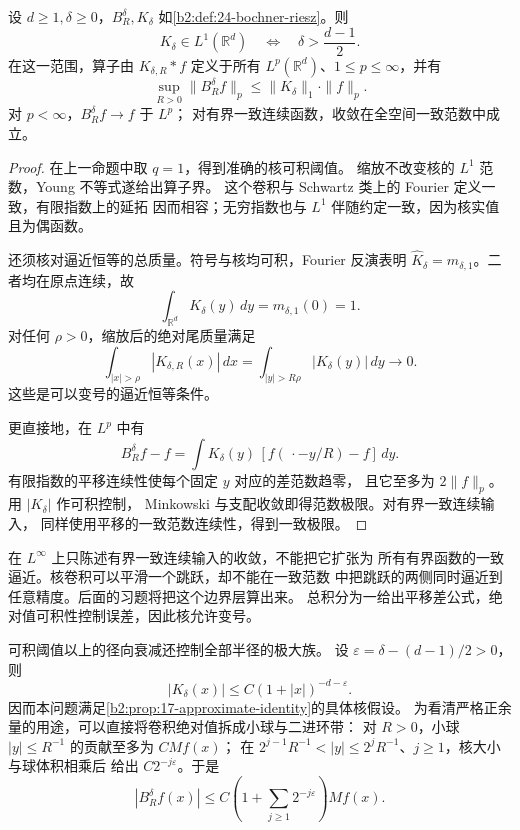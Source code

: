 \begin{theorem}[可积核范围]\label{b2:thm:24-integrable}
设 \(d\geq1,\delta\geq0\)，\(B_R^\delta,K_\delta\)
如\cref{b2:def:24-bochner-riesz}。则
\[
 K_\delta\in L^1(\mathbb R^d)
       \quad\Longleftrightarrow\quad \delta>\frac{d-1}{2}.
\]
在这一范围，算子由 \(K_{\delta,R}*f\) 定义于所有
\(L^p(\mathbb R^d)\)、\(1\leq p\leq\infty\)，并有
\[
 \sup_{R>0}\|B_R^\delta f\|_p
       \leq\|K_\delta\|_1\cdot\|f\|_p.
\]
对 \(p<\infty\)，\(B_R^\delta f\to f\) 于 \(L^p\)；
对有界一致连续函数，收敛在全空间一致范数中成立。
\end{theorem}
\begin{proof}
在上一命题中取 \(q=1\)，得到准确的核可积阈值。
缩放不改变核的 \(L^1\) 范数，Young 不等式遂给出算子界。
这个卷积与 Schwartz 类上的 Fourier 定义一致，有限指数上的延拓
因而相容；无穷指数也与 \(L^1\) 伴随约定一致，因为核实值且为偶函数。

还须核对逼近恒等的总质量。符号与核均可积，Fourier 反演表明
\(\widehat K_\delta=m_{\delta,1}\)。二者均在原点连续，故
\[
 \int_{\mathbb R^d}K_\delta(y)\,dy=m_{\delta,1}(0)=1.
\]
对任何 \(\rho>0\)，缩放后的绝对尾质量满足
\[
 \int_{|x|>\rho}|K_{\delta,R}(x)|\,dx
       =\int_{|y|>R\rho}|K_\delta(y)|\,dy\longrightarrow0.
\]
这些是可以变号的逼近恒等条件。

更直接地，在 \(L^p\) 中有
\[
 B_R^\delta f-f
       =\int K_\delta(y)\,[f(\,\cdot-y/R)-f]\,dy.
\]
有限指数的平移连续性使每个固定 \(y\) 对应的差范数趋零，
且它至多为 \(2\|f\|_p\)。用 \(|K_\delta|\) 作可积控制，
Minkowski 与支配收敛即得范数极限。对有界一致连续输入，
同样使用平移的一致范数连续性，得到一致极限。
\end{proof}

在 \(L^\infty\) 上只陈述有界一致连续输入的收敛，不能把它扩张为
所有有界函数的一致逼近。核卷积可以平滑一个跳跃，却不能在一致范数
中把跳跃的两侧同时逼近到任意精度。后面的习题将把这个边界层算出来。
总积分为一给出平移差公式，绝对值可积性控制误差，因此核允许变号。

\ProseParagraphBreak
可积阈值以上的径向衰减还控制全部半径的极大族。
设 \(\varepsilon=\delta-(d-1)/2>0\)，则
\[
 |K_\delta(x)|\leq C(1+|x|)^{-d-\varepsilon}.
\]
因而本问题满足\cref{b2:prop:17-approximate-identity}的具体核假设。
为看清严格正余量的用途，可以直接将卷积绝对值拆成小球与二进环带：
对 \(R>0\)，小球 \(|y|\leq R^{-1}\) 的贡献至多为 \(CMf(x)\)；
在
\(2^{j-1}R^{-1}<|y|\leq2^jR^{-1}\)、\(j\geq1\)，核大小与球体积相乘后
给出 \(C2^{-j\varepsilon}\)。于是
\[
 |B_R^\delta f(x)|
 \leq C\left(1+\sum_{j\geq1}2^{-j\varepsilon}\right)Mf(x).
\]

